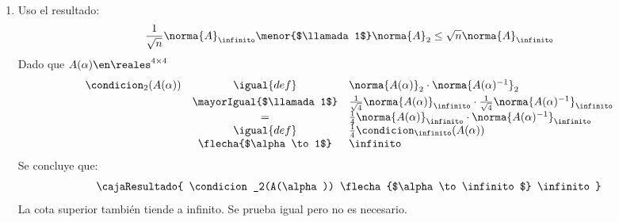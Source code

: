 \begin{enumerate}[label=\alph*)]
  \item
        Uso el resultado:
        $$
          \frac{1}{\sqrt{n}} \norma{A}_\infinito \menor{$\llamada1$} \norma{A}_2 \leq \sqrt{n} \norma{A}_\infinito
        $$
        Dado que $A(\alpha) \en \reales^{4 \times 4}$
        $$
          \begin{array}{rcl}\vspace{3pt}
            \condicion_2(A(\alpha))
             & \igual{def}              &
            \norma{A(\alpha)}_2 \cdot \norma{A(\alpha)^{-1}}_2                                                     \\
             & \mayorIgual{$\llamada1$} &
            \frac{1}{\sqrt{4}}\norma{A(\alpha)}_\infinito \cdot \frac{1}{\sqrt{4}}\norma{A(\alpha)^{-1}}_\infinito \\
             & =                        &
            \frac{1}{4}\norma{A(\alpha)}_\infinito \cdot \norma{A(\alpha)^{-1}}_\infinito                          \\
             & \igual{def}              &
            \frac{1}{4} \condicion_\infinito(A(\alpha))                                                            \\
             & \flecha{$\alpha \to 1$}  & \infinito
          \end{array}
        $$
        Se concluye que:
        $$
          \cajaResultado{
            \condicion_2(A(\alpha))
            \flecha{$\alpha \to \infinito$}
            \infinito
          }
        $$
        La cota superior también tiende a infinito. Se prueba igual pero no es necesario.
\end{enumerate}

\begin{aportes}
  \item {}
\end{aportes}
